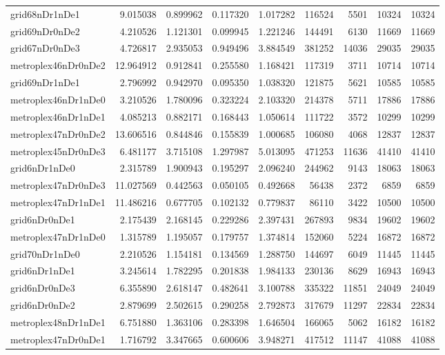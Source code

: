 \begin{longtable}{|l|r|r|r|r|r|r|r|r|}
grid68nDr1nDe1 & 9.015038 & 0.899962 & 0.117320 & 1.017282 & 116524 & 5501 & 10324 & 10324 \\
grid69nDr0nDe2 & 4.210526 & 1.121301 & 0.099945 & 1.221246 & 144491 & 6130 & 11669 & 11669 \\
grid67nDr0nDe3 & 4.726817 & 2.935053 & 0.949496 & 3.884549 & 381252 & 14036 & 29035 & 29035 \\
metroplex46nDr0nDe2 & 12.964912 & 0.912841 & 0.255580 & 1.168421 & 117319 & 3711 & 10714 & 10714 \\
grid69nDr1nDe1 & 2.796992 & 0.942970 & 0.095350 & 1.038320 & 121875 & 5621 & 10585 & 10585 \\
metroplex46nDr1nDe0 & 3.210526 & 1.780096 & 0.323224 & 2.103320 & 214378 & 5711 & 17886 & 17886 \\
metroplex46nDr1nDe1 & 4.085213 & 0.882171 & 0.168443 & 1.050614 & 111722 & 3572 & 10299 & 10299 \\
metroplex47nDr0nDe2 & 13.606516 & 0.844846 & 0.155839 & 1.000685 & 106080 & 4068 & 12837 & 12837 \\
metroplex45nDr0nDe3 & 6.481177 & 3.715108 & 1.297987 & 5.013095 & 471253 & 11636 & 41410 & 41410 \\
grid6nDr1nDe0 & 2.315789 & 1.900943 & 0.195297 & 2.096240 & 244962 & 9143 & 18063 & 18063 \\
metroplex47nDr0nDe3 & 11.027569 & 0.442563 & 0.050105 & 0.492668 & 56438 & 2372 & 6859 & 6859 \\
metroplex47nDr1nDe1 & 11.486216 & 0.677705 & 0.102132 & 0.779837 & 86110 & 3422 & 10500 & 10500 \\
grid6nDr0nDe1 & 2.175439 & 2.168145 & 0.229286 & 2.397431 & 267893 & 9834 & 19602 & 19602 \\
metroplex47nDr1nDe0 & 1.315789 & 1.195057 & 0.179757 & 1.374814 & 152060 & 5224 & 16872 & 16872 \\
grid70nDr1nDe0 & 2.210526 & 1.154181 & 0.134569 & 1.288750 & 144697 & 6049 & 11445 & 11445 \\
grid6nDr1nDe1 & 3.245614 & 1.782295 & 0.201838 & 1.984133 & 230136 & 8629 & 16943 & 16943 \\
grid6nDr0nDe3 & 6.355890 & 2.618147 & 0.482641 & 3.100788 & 335322 & 11851 & 24049 & 24049 \\
grid6nDr0nDe2 & 2.879699 & 2.502615 & 0.290258 & 2.792873 & 317679 & 11297 & 22834 & 22834 \\
metroplex48nDr1nDe1 & 6.751880 & 1.363106 & 0.283398 & 1.646504 & 166065 & 5062 & 16182 & 16182 \\
metroplex47nDr0nDe1 & 1.716792 & 3.347665 & 0.600606 & 3.948271 & 417512 & 11147 & 41088 & 41088 \\

\end{longtable}
